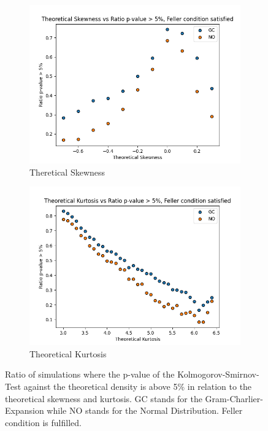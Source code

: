 \begin{figure}
    \centering
    \begin{subfigure}[b]{0.4\textwidth}
        \centering
        \includegraphics[width=\textwidth]{img/theoretical_skewness_vs_ratio_feller_condition_true.png}
        \caption{Theretical Skewness}
    \end{subfigure}
    \hfill
    \begin{subfigure}[b]{0.4\textwidth}
        \centering
        \includegraphics[width=\textwidth]{img/theoretical_kurtosis_vs_ratio_feller_condition_true.png}
        \caption{Theoretical Kurtosis}
    \end{subfigure}
    \caption{Ratio of simulations where the p-value of the Kolmogorov-Smirnov-Test against the theoretical density is above 5\% in relation to the theoretical skewness and kurtosis. GC stands for the Gram-Charlier-Expansion while NO stands for the Normal Distribution. Feller condition is fulfilled.}
    \label{fig:gc_vs_no_theoretical_skewness_kurtosis}
\end{figure}

